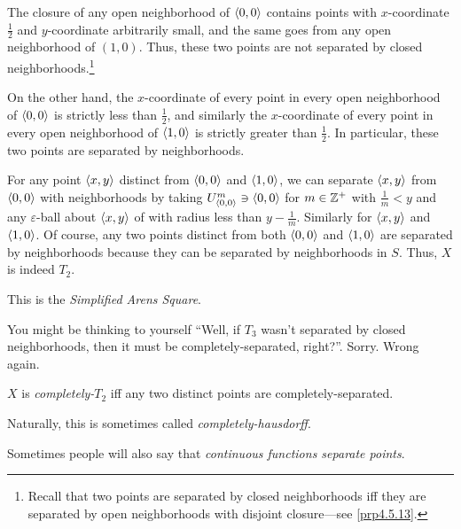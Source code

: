\begin{exm}
The closure of any open neighborhood of $\langle0,0\rangle$ contains points with $x$-coordinate $\frac{1}{2}$ and $y$-coordinate arbitrarily small, and the same goes from any open neighborhood of $(1,0)$.  Thus, these two points are not separated by closed neighborhoods.\footnote{Recall that two points are separated by closed neighborhoods iff they are separated by open neighborhoods with disjoint closure---see \cref{prp4.5.13}.}

On the other hand, the $x$-coordinate of every point in every open neighborhood of $\langle0,0\rangle$ is strictly less than $\frac{1}{2}$, and similarly the $x$-coordinate of every point in every open neighborhood of $\langle1,0\rangle$ is strictly greater than $\frac{1}{2}$.  In particular, these two points are separated by neighborhoods.

For any point $\langle x,y\rangle$ distinct from $\langle0,0\rangle$ and $\langle1,0\rangle$, we can separate $\langle x,y\rangle$ from $\langle0,0\rangle$ with neighborhoods by taking $U_{\langle0,0\rangle}^m\ni \langle0,0\rangle$ for $m\in \mathbb{Z} ^+$ with $\frac{1}{m}<y$ and any $\varepsilon$-ball about $\langle x,y\rangle$ of with radius less than $y-\frac{1}{m}$.  Similarly for $\langle x,y\rangle$ and $\langle1,0\rangle$.  Of course, any two points distinct from both $\langle0,0\rangle$ and $\langle1,0\rangle$ are separated by neighborhoods because they can be separated by neighborhoods in $S$.  Thus, $X$ is indeed $T_2$.
\begin{rmk}
This is the \emph{Simplified Arens Square}.
\end{rmk}
\end{exm}
You might be thinking to yourself ``Well, if $T_3$ wasn't separated by closed neighborhoods, then it must be completely-separated, right?''.  Sorry.  Wrong again.
\begin{dfn}[Completely-$T_2$]\label{CompletelyT2}
$X$ is \emph{completely-$T_2$} iff any two distinct points are completely-separated.
\begin{rmk}
Naturally, this is sometimes called \emph{completely-hausdorff}.
\end{rmk}
\begin{rmk}
Sometimes people will also say that \emph{continuous functions separate points}.
\end{rmk}
\end{dfn}
